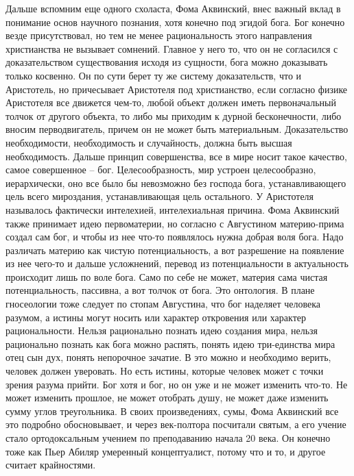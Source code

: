 \documentclass[a4paper, 12pt]{article}
\begin{document}
Дальше вспомним еще одного схоласта, Фома Аквинский, внес важный вклад 
в понимание основ научного познания, хотя конечно под эгидой бога. Бог 
конечно везде присутствовал, но тем не менее рациональность этого 
направления христианства не вызывает сомнений. Главное у него то, что он 
не согласился с доказательством существования исходя из сущности, бога 
можно доказывать только косвенно. Он по сути берет ту же систему 
доказательств, что и Аристотель, но причесывает Аристотеля под 
христианство, если согласно физике Аристотеля все движется чем-то, любой 
объект должен иметь первоначальный толчок от другого объекта, то либо мы 
приходим к дурной бесконечности, либо вносим перводвигатель, причем он 
не может быть материальным. Доказательство необходимости, необходимость 
и случайность, должна быть высшая необходимость. Дальше принцип 
совершенства, все в мире носит такое качество, самое совершенное -- бог. 
Целесообразность, мир устроен целесообразно, иерархически, оно все было 
бы невозможно без господа бога, устанавливающего цель всего мироздания, 
устанавливающая цель остального. У Аристотеля называлось фактически 
интелехией, интелехиальная причина. Фома Аквинский также принимает идею 
первоматерии, но согласно с Августином материю-прима создал сам бог, 
и чтобы из нее что-то появлялось нужна добрая воля бога. Надо различать 
материю как чистую потенциальность, а вот разрешение на появление из нее 
чего-то и дальше усложнений, перевод из потенциальности в актуальность 
происходит лишь по воле бога. Само по себе не может, материя сама чистая 
потенциальность, пассивна, а вот толчок от бога. Это онтология. В плане 
гносеологии тоже следует по стопам Августина, что бог наделяет человека 
разумом, а истины могут носить или характер откровения или характер 
рациональности. Нельзя рационально познать идею создания мира, нельзя 
рационально познать как бога можно распять, понять идею три-единства 
мира отец сын дух, понять непорочное зачатие. В это можно и необходимо 
верить, человек должен уверовать. Но есть истины, которые человек может 
с точки зрения разума прийти. Бог хотя и бог, но он уже и не может 
изменить что-то. Не может изменить прошлое, не может отобрать душу, не 
может даже изменить сумму углов треугольника. В своих произведениях, 
сумы, Фома Аквинский все это подробно обосновывает, и через век-полтора 
посчитали святым, а его учение стало ортодоксальным учением по 
преподаванию начала 20 века. Он конечно тоже как Пьер Абиляр умеренный 
концептуалист, потому что и то, и другое считает крайностями.
\end{document}
